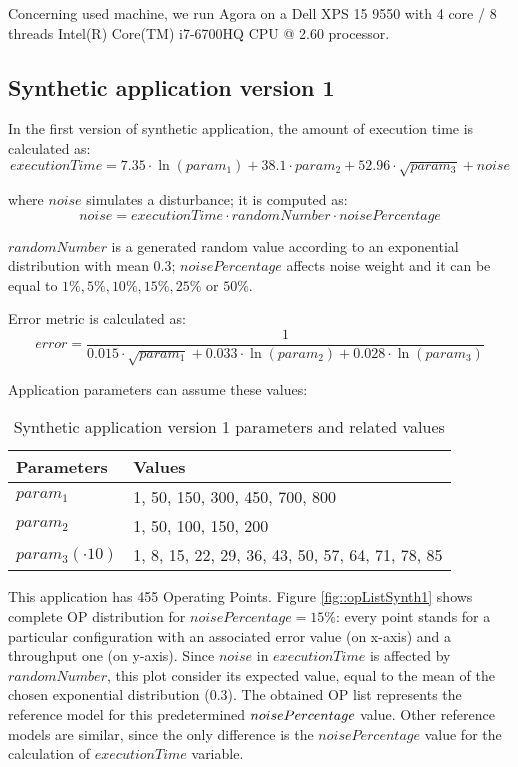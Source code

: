 Concerning used machine, we run Agora on a Dell XPS 15 9550 with 4 core / 8 threads Intel(R) Core(TM) i7-6700HQ CPU @ 2.60 processor.


\subsection{Synthetic application version 1}

In the first version of synthetic application, the amount of execution time is calculated as:
\[
executionTime = 7.35 \cdot \ln{(param_1)} + 38.1 \cdot param_2 + 52.96 \cdot \sqrt{param_3} + noise
\]

where $noise$ simulates a disturbance; it is computed as:
\[
noise = executionTime \cdot randomNumber \cdot noisePercentage
\]

$randomNumber$ is a generated random value according to an exponential distribution with mean 0.3; $noisePercentage$ affects noise weight and it can be equal to $1\%, 5\%, 10\%, 15\%, 25\%$ or $50\%$.

Error metric is calculated as:
\[
error = \dfrac{1}{0.015 \cdot \sqrt{param_1} + 0.033 \cdot \ln{(param_2)} + 0.028 \cdot \ln{(param_3)}}
\]

Application parameters can assume these values:

\begin{table}[h]

    \centering

    \begin{tabular}{ll}
    
        \toprule
        Parameters & Values \\
        \midrule
        $param_1$ & 1, 50, 150, 300, 450, 700, 800 \\
        $param_2$ & 1, 50, 100, 150, 200 \\
        $param_3 (\cdot 10)$ & 1, 8, 15, 22, 29, 36, 43, 50, 57, 64, 71, 78, 85 \\
        \bottomrule 
    
    \end{tabular}

    \caption{Synthetic application version 1 parameters and related values}

\end{table}

This application has 455 Operating Points. Figure \ref{fig::opListSynth1} shows complete OP distribution for $noisePercentage = 15\%$: every point stands for a particular configuration with an associated error value (on x-axis) and a throughput one (on y-axis). Since $noise$ in $executionTime$ is affected by $randomNumber$, this plot consider its expected value, equal to the mean of the chosen exponential distribution (0.3). The obtained OP list represents the reference model for this predetermined $noise\-Per\-cent\-age$ value. Other reference models are similar, since the only difference is the $noisePercentage$ value for the calculation of $executionTime$ variable.

